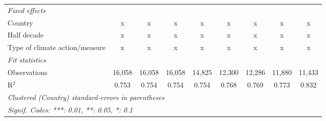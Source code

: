 \begin{table}[htbp]
\begin{tabular}{lcccccccc}
      \emph{Fixed effects}\\
      Country                                                                  & x       & x       & x            & x            & x             & x             & x             & x\\  
      Half decade                                                              & x       & x       & x            & x            & x             & x             & x             & x\\  
      Type of climate action/measure                                           & x       & x       & x            & x            & x             & x             & x             & x\\  
      \midrule \emph{Fit statistics}\\
      Observations                                                             & 16,058  & 16,058  & 16,058       & 14,825       & 12,300        & 12,286        & 11,880        & 11,433\\  
      R$^2$                                                                    & 0.753   & 0.754   & 0.754        & 0.754        & 0.768         & 0.769         & 0.773         & 0.832\\  
      \midrule
      \multicolumn{9}{l}{\emph{Clustered (Country) standard-errors in parentheses}}\\
      \multicolumn{9}{l}{\emph{Signif. Codes: ***: 0.01, **: 0.05, *: 0.1}}\\
   \end{tabular}
\end{table}


